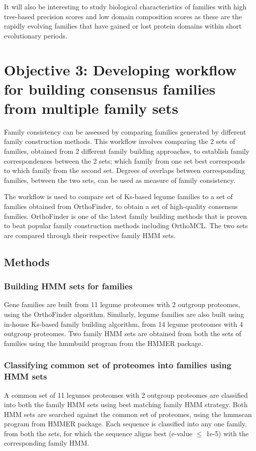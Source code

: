 \documentclass{article}
\begin{document}
	It will also be interesting to study biological characteristics of families with high tree-based precision scores and low domain composition scores as these are the rapidly evolving families that have gained or lost protein domains within short evolutionary periods.
	
	\pagebreak
	\section{Objective 3: Developing workflow for building consensus families from multiple family sets}
	Family consistency can be assessed by comparing families generated by different family construction methods. This workflow involves comparing the 2 sets of families, obtained from 2 different family building approaches, to establish family correspondences between the 2 sets; which family from one set best corresponds to which family from the second set. Degrees of overlaps between corresponding families, between the two sets, can be used as measure of family consistency.
	
	The workflow is used to compare set of Ks-based legume families to a set of families obtained from OrthoFinder, to obtain a set of high-quality consensus families. OrthoFinder is one of the latest family building methods that is proven to beat popular family construction methods including OrthoMCL. The two sets are compared through their respective family HMM sets.
	
		\subsection{Methods}
			\subsubsection{Building HMM sets for families}
			Gene families are built from 11 legume proteomes with 2 outgroup proteomes, using the OrthoFinder algorithm. Similarly, legume families are also built using in-house Ks-based family building algorithm, from 14 legume proteomes with 4 outgroup proteomes. Two family HMM sets are obtained from both the sets of families using the hmmbuild program from the HMMER package.
			
			\subsubsection{Classifying common set of proteomes into families using HMM sets}
			A common set of 11 legumes proteomes with 2 outgroup proteomes are classified into both the family HMM sets using best matching family HMM strategy. Both HMM sets are searched against the common set of proteomes, using the hmmscan program from HMMER package. Each sequence is classified into any one family, from both the sets, for which the sequence aligns best (e-value $\leq$ 1e-5) with the corresponding family HMM.
			
\end{document}
